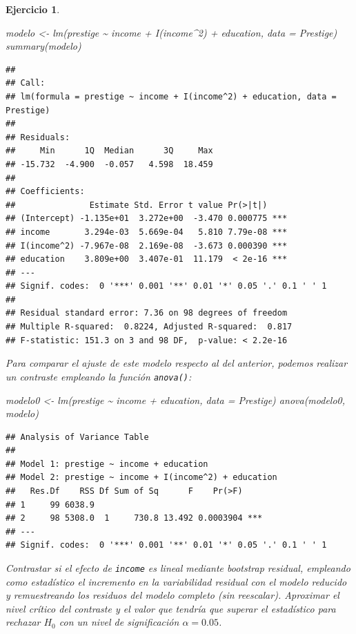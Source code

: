\documentclass[
]{book}
\newenvironment{Shaded}{\begin{snugshade}}{\end{snugshade}}
\newcommand{\AttributeTok}[1]{\textcolor[rgb]{0.77,0.63,0.00}{#1}}
\newcommand{\DecValTok}[1]{\textcolor[rgb]{0.00,0.00,0.81}{#1}}
\newcommand{\FunctionTok}[1]{\textcolor[rgb]{0.00,0.00,0.00}{#1}}
\newcommand{\NormalTok}[1]{#1}
\newcommand{\OtherTok}[1]{\textcolor[rgb]{0.56,0.35,0.01}{#1}}
\newcommand{\SpecialCharTok}[1]{\textcolor[rgb]{0.00,0.00,0.00}{#1}}
\theoremstyle{break}
\newtheorem{exercise}{Ejercicio}[chapter]
\theoremstyle{nonumberplain}
\begin{document}
\begin{exercise}
\begin{Shaded}
\begin{Highlighting}[]
\NormalTok{modelo }\OtherTok{\textless{}{-}} \FunctionTok{lm}\NormalTok{(prestige }\SpecialCharTok{\textasciitilde{}}\NormalTok{ income }\SpecialCharTok{+} \FunctionTok{I}\NormalTok{(income}\SpecialCharTok{\^{}}\DecValTok{2}\NormalTok{) }\SpecialCharTok{+}\NormalTok{ education, }\AttributeTok{data =}\NormalTok{ Prestige)}
\FunctionTok{summary}\NormalTok{(modelo)}
\end{Highlighting}
\end{Shaded}

\begin{verbatim}
## 
## Call:
## lm(formula = prestige ~ income + I(income^2) + education, data = Prestige)
## 
## Residuals:
##     Min      1Q  Median      3Q     Max 
## -15.732  -4.900  -0.057   4.598  18.459 
## 
## Coefficients:
##               Estimate Std. Error t value Pr(>|t|)    
## (Intercept) -1.135e+01  3.272e+00  -3.470 0.000775 ***
## income       3.294e-03  5.669e-04   5.810 7.79e-08 ***
## I(income^2) -7.967e-08  2.169e-08  -3.673 0.000390 ***
## education    3.809e+00  3.407e-01  11.179  < 2e-16 ***
## ---
## Signif. codes:  0 '***' 0.001 '**' 0.01 '*' 0.05 '.' 0.1 ' ' 1
## 
## Residual standard error: 7.36 on 98 degrees of freedom
## Multiple R-squared:  0.8224, Adjusted R-squared:  0.817 
## F-statistic: 151.3 on 3 and 98 DF,  p-value: < 2.2e-16
\end{verbatim}

Para comparar el ajuste de este modelo respecto al del anterior, podemos
realizar un contraste empleando la función \texttt{anova()}:

\begin{Shaded}
\begin{Highlighting}[]
\NormalTok{modelo0 }\OtherTok{\textless{}{-}} \FunctionTok{lm}\NormalTok{(prestige }\SpecialCharTok{\textasciitilde{}}\NormalTok{ income }\SpecialCharTok{+}\NormalTok{ education, }\AttributeTok{data =}\NormalTok{ Prestige)}
\FunctionTok{anova}\NormalTok{(modelo0, modelo)}
\end{Highlighting}
\end{Shaded}

\begin{verbatim}
## Analysis of Variance Table
## 
## Model 1: prestige ~ income + education
## Model 2: prestige ~ income + I(income^2) + education
##   Res.Df    RSS Df Sum of Sq      F    Pr(>F)    
## 1     99 6038.9                                  
## 2     98 5308.0  1     730.8 13.492 0.0003904 ***
## ---
## Signif. codes:  0 '***' 0.001 '**' 0.01 '*' 0.05 '.' 0.1 ' ' 1
\end{verbatim}

Contrastar si el efecto de \texttt{income} es lineal mediante bootstrap residual,
empleando como estadístico el incremento en la variabilidad residual con el
modelo reducido y remuestreando los residuos del modelo completo (sin reescalar).
Aproximar el nivel crítico del contraste y el valor que tendría que superar el
estadístico para rechazar \(H_0\) con un nivel de significación \(\alpha = 0.05\).
\end{exercise}
\end{document}
